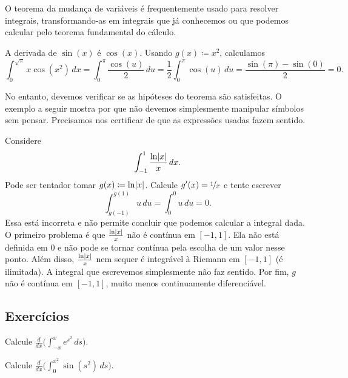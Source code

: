 O teorema da mudança de variáveis é frequentemente usado para resolver
integrais, transformando-as em integrais que já conhecemos ou que podemos
calcular pelo teorema fundamental do cálculo.

\begin{example}
A derivada de $\sin(x)$ é $\cos(x)$.
Usando $g(x) \coloneqq x^2$, calculamos
\begin{equation*}
\int_0^{\sqrt{\pi}} x \cos(x^2) \, dx = \int_0^\pi \frac{\cos(u)}{2} \, du
=
\frac{1}{2}
\int_0^\pi \cos(u) \, du
=
\frac{
\sin(\pi) - \sin(0)
}{2}
=
0 .
\end{equation*}
\end{example}

No entanto, devemos verificar se as hipóteses do teorema são satisfeitas.
O exemplo a seguir mostra por que não devemos simplesmente
manipular símbolos sem pensar.
Precisamos nos certificar de que as expressões usadas fazem sentido.

\begin{example}
Considere
\begin{equation*}
\int_{-1}^{1} \frac{\ln \lvert {x} \rvert}{x} \,dx .
\end{equation*}
Pode ser tentador tomar $g(x) \coloneqq \ln \lvert {x} \rvert$. Calcule
$g'(x) = \nicefrac{1}{x}$ e tente escrever
\begin{equation*}
\int_{g(-1)}^{g(1)} u \,du = 
\int_{0}^{0} u \,du = 0. 
\end{equation*}
Essa  está incorreta e não permite concluir
que podemos calcular a integral dada. O primeiro problema é que
$\frac{\ln \lvert {x} \rvert}{x}$ não é contínua em $[-1,1]$.
Ela não está definida em $0$ e não pode se tornar contínua pela escolha de
um valor nesse ponto.
Além disso, $\frac{\ln \lvert {x} \rvert}{x}$ nem sequer é integrável à Riemann em
$[-1,1]$ (é ilimitada).
A integral que escrevemos simplesmente não faz sentido.
Por fim, $g$ não é contínua em $[-1,1]$, muito menos continuamente
diferenciável.
\end{example}

\subsection{Exercícios}

\begin{exercise}
Calcule
$\displaystyle
\frac{d}{dx} \biggl( \int_{-x}^x e^{s^2}\,ds \biggr)$.
\end{exercise}

\begin{exercise}
Calcule
$\displaystyle
\frac{d}{dx} \biggl( \int_{0}^{x^2} \sin(s^2)\,ds \biggr)$.
\end{exercise}

